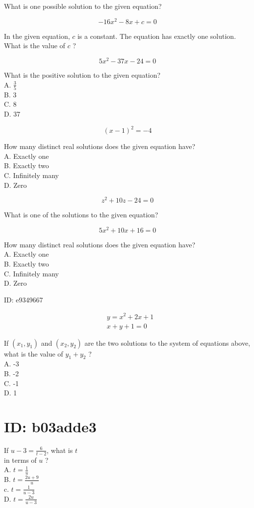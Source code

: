 What is one possible solution to the given equation?

$$
-16 x^{2}-8 x+c=0
$$

In the given equation, $c$ is a constant. The equation has exactly one solution. What is the value of $c$ ?

$$
5 x^{2}-37 x-24=0
$$

What is the positive solution to the given equation?\\
A. $\frac{3}{5}$\\
B. 3\\
C. 8\\
D. 37

$$
(x-1)^{2}=-4
$$

How many distinct real solutions does the given equation have?\\
A. Exactly one\\
B. Exactly two\\
C. Infinitely many\\
D. Zero

$$
z^{2}+10 z-24=0
$$

What is one of the solutions to the given equation?

$$
5 x^{2}+10 x+16=0
$$

How many distinct real solutions does the given equation have?\\
A. Exactly one\\
B. Exactly two\\
C. Infinitely many\\
D. Zero

ID: e9349667

$$
\begin{aligned}
& y=x^{2}+2 x+1 \\
& x+y+1=0
\end{aligned}
$$

If $\left(x_{1}, y_{1}\right)$ and $\left(x_{2}, y_{2}\right)$ are the two solutions to the system of equations above, what is the value of $y_{1}+y_{2}$ ?\\
A. -3\\
B. -2\\
C. -1\\
D. 1

\section*{ID: b03adde3}
If $u-3=\frac{6}{t-2}$, what is $t$\\
in terms of $u$ ?\\
A. $t=\frac{1}{u}$\\
B. $t=\frac{2 u+9}{u}$\\
c. $t=\frac{1}{u-3}$\\
D. $t=\frac{2 u}{u-3}$


